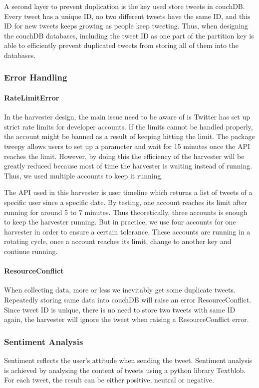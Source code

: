 A second layer to prevent duplication is the key used store tweets in couchDB. Every tweet has a unique ID, no two different tweets have the same ID, and this ID for new tweets keeps growing as people keep tweeting. Thus, when designing the couchDB databases, including the tweet ID as one part of the partition key is able to efficiently prevent duplicated tweets from storing all of them into the databases.
\subsubsection{Error Handling}
\paragraph{RateLimitError}In the harvester design, the main issue need to be aware of is Twitter has set up strict rate limits for developer accounts. If the limits cannot be handled properly, the account might be banned as a result of keeping hitting the limit.
The package tweepy allows users to set up a parameter and wait for 15 minutes once the API reaches the limit. However, by doing this the efficiency of the harvester will be greatly reduced because most of time the harvester is waiting instead of running. Thus, we used multiple accounts to keep it running.

The API used in this harvester is user timeline which returns a list of tweets of a specific user since a specific date. By testing, one account reaches its limit after running for around 5 to 7 minutes. Thus theoretically, three accounts is enough to keep the harvester running. But in practice, we use four accounts for one harvester in order to ensure a certain tolerance. These accounts are running in a rotating cycle, once a account reaches its limit, change to another key and continue running.

\paragraph{ResourceConflict}
When collecting data, more or less we inevitably get some duplicate tweets. Repeatedly storing same data into couchDB will raise an error ResourceConflict. Since tweet ID is unique, there is no need to store two tweets with same ID again, the harvester will ignore the tweet when raising a ResourceConflict error.

\subsubsection{Sentiment Analysis}
Sentiment reflects the user's attitude when sending the tweet. Sentiment analysis is achieved by analysing the content of tweets using a python library Textblob. For each tweet, the result can be either positive, neutral or negative.

